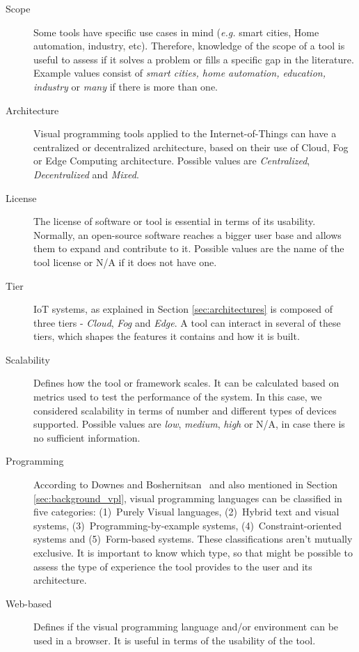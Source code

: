 \begin{description}
    \item [Scope] Some tools have specific use cases in mind (\textit{e.g.} smart cities, Home automation, industry, etc). Therefore, knowledge of the scope of a tool is useful to assess if it solves a problem or fills a specific gap in the literature. Example values consist of \textit{smart cities, home automation, education, industry} or \textit{many} if there is more than one. 
    \item [Architecture] Visual programming tools applied to the Internet-of-Things can have a centralized or decentralized architecture, based on their use of Cloud, Fog or Edge Computing architecture. Possible values are \textit{Centralized}, \textit{Decentralized} and \textit{Mixed}.
    \item [License] The license of software or tool is essential in terms of its usability. Normally, an open-source software reaches a bigger user base and allows them to expand and contribute to it. Possible values are the name of the tool license or N/A if it does not have one.
    \item [Tier] IoT systems, as explained in Section \ref{sec:architectures} is composed of three tiers - \textit{Cloud}, \textit{Fog} and \textit{Edge}. A tool can interact in several of these tiers, which shapes the features it contains and how it is built.
    \item [Scalability] Defines how the tool or framework scales. It can be calculated based on metrics used to test the performance of the system. In this case, we considered scalability in terms of number and different types of devices supported. Possible values are \textit{low}, \textit{medium}, \textit{high} or N/A, in case there is no sufficient information.
    \item [Programming] According to Downes and Boshernitsan~\cite{vpls_survey} and also mentioned in Section \ref{sec:background_vpl}, visual programming languages can be classified in five categories: (1)~Purely Visual languages, (2)~Hybrid text and visual systems, (3)~Programming-by-example systems, (4)~Constraint-oriented systems and (5)~Form-based systems. These classifications aren't mutually exclusive. It is important to know which type, so that might be possible to assess the type of experience the tool provides to the user and its architecture.
    \item [Web-based] Defines if the visual programming language and/or environment can be used in a browser. It is useful in terms of the usability of the tool.
\end{description}

